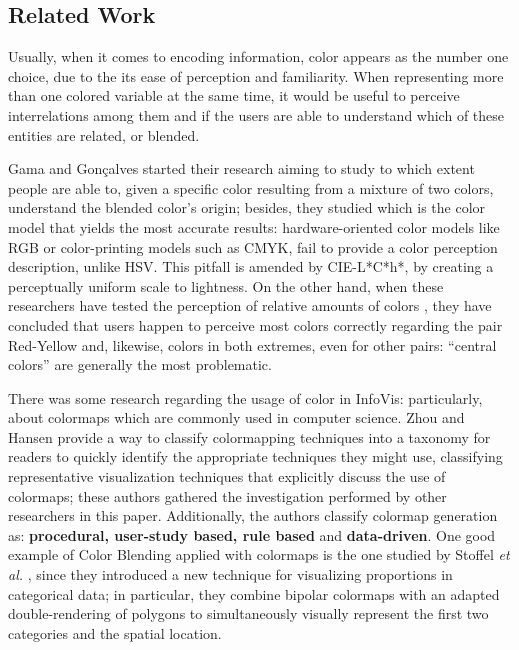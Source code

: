 \subsection{Related Work}
%
Usually, when it comes to encoding information, color appears as the number one choice, due to the its ease of perception and
familiarity. When representing more than one colored variable at the same time, it would be useful to perceive interrelations
among them and if the users are able to understand which of these entities are related, or blended. \par
%
Gama and Gonçalves started their research \cite{Gama20141} aiming to study to which extent people are able to, given a specific
color resulting from a mixture of two colors, understand the blended color’s origin; besides, they studied which is the color
model that yields the most accurate results: hardware-oriented color models like RGB or color-printing models such as CMYK,
fail to provide a color perception description, unlike HSV. This pitfall is amended by CIE-L*C*h*, by creating a perceptually
uniform scale to lightness. On the other hand, when these researchers have tested the perception of relative amounts of colors
\cite{Gama20142}, they have concluded that users happen to perceive most colors correctly regarding the pair Red-Yellow and,
likewise, colors in both extremes, even for other pairs: “central colors” are generally the most problematic.\par
%
There was some research regarding the usage of color in InfoVis: particularly, about colormaps which are commonly used
in computer science. Zhou and Hansen \cite{Zhou2016} provide a way to classify colormapping techniques into
a taxonomy for readers to quickly identify the appropriate techniques they might use, classifying representative
visualization techniques that explicitly discuss the use of colormaps; these authors gathered the investigation
performed by other researchers in this paper. Additionally, the authors classify colormap generation as:
\textbf{procedural, user-study based, rule based} and \textbf{data-driven}. One good example of Color Blending
applied with colormaps is the one studied by Stoffel \emph{et al.} \cite{Stoffel2012}, since they introduced a
new technique for visualizing proportions in categorical data; in particular, they combine bipolar colormaps
with an adapted double-rendering of polygons to simultaneously visually represent the first two categories
and the spatial location.
